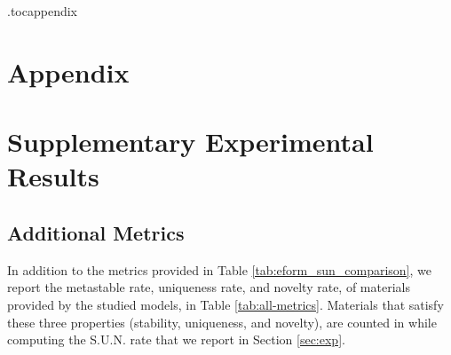 \documentclass{article}
\theoremstyle{plain}
\theoremstyle{definition}
\theoremstyle{remark}
\begin{document}


\newpage
\appendix
\etocdepthtag.toc{appendix} %

\section*{Appendix}

\tableofcontents

\clearpage


\section{Supplementary Experimental Results}
\label{app:more-exp}


\subsection{Additional Metrics} 
\label{app:additional}
In addition to the metrics provided in Table \ref{tab:eform_sun_comparison}, we report the metastable rate, uniqueness rate, and novelty rate, of materials provided by the studied models, in Table \ref{tab:all-metrics}. 
Materials that satisfy these three properties (stability, uniqueness, and novelty), are counted in while computing the S.U.N. rate that we report in Section \ref{sec:exp}.
\end{document}
